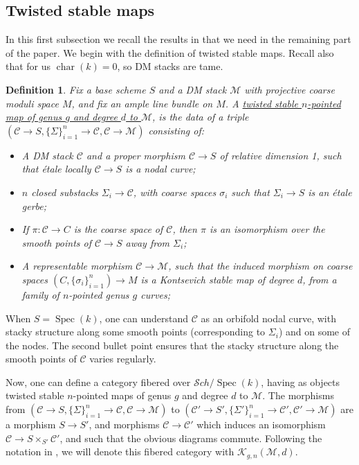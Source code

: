 \documentclass[11pt]{amsart}
\newcommand{\cC}{\mathcal{C}}
\newcommand{\sM}{\mathscr{M}}
\newcommand{\cS}{\mathcal{S}}
\newcommand{\spec}{\operatorname{Spec}}
\newtheorem{Def}[theorem]{Definition}
\theoremstyle{definition}
\begin{document}
\subsection{Twisted stable maps} In this first subsection we recall the results in \cite{AV2} that we need in the remaining part of the paper.
We begin with the definition of twisted stable maps. Recall also that for us $\operatorname{char}(k)=0$, so DM stacks are tame.
\begin{Def}
 Fix a base scheme $S$ and a DM stack $\sM$ with projective coarse moduli space $M$, and fix an ample line bundle on $M$.
 A \underline{twisted stable $n$-pointed map of genus $g$ and degree $d$ to $\sM$}, is the data of a triple $(\cC \to S ,\{\Sigma\}_{i=1}^n \to \cC, \cC \to \sM)$
 consisting of:
 \begin{itemize}
  \item A DM stack $\cC$ and a proper morphism $\cC \to S$ of relative dimension 1, such that étale locally $\cC \to S$ is a nodal curve;
   \item $n$ closed substacks $\Sigma_i \to \cC$, with coarse spaces $\sigma_i$ such that $\Sigma_i \to S$ is an étale gerbe;
  \item If $\pi:\cC \to C$ is the coarse space of $\cC$, then $\pi$ is an isomorphism over the smooth points of
  $\cC \to S$ away from $\Sigma_i$;
  \item A representable morphism $\cC \to \sM$, such that the induced morphism on coarse spaces $(C, \{\sigma_i\}_{i=1}^n) \to M$
  is a Kontsevich stable map of degree $d$, from a family of $n$-pointed genus $g$ curves;
  \end{itemize}
\end{Def}

When $S=\spec(k)$, one can understand $\cC$ as an orbifold nodal curve, with stacky structure along some smooth points (corresponding to $\Sigma_i$) and on some of the nodes.
The second bullet point ensures that the stacky structure along the smooth points of $\cC$ varies regularly.

Now, one can define a category fibered over $\cS ch/\spec(k)$, having as objects twisted stable $n$-pointed maps of genus $g$ and degree $d$ to $\sM$.
The morphisms from $(\cC \to S ,\{\Sigma\}_{i=1}^n \to \cC, \cC \to \sM)$ to
$(\cC' \to S' ,\{\Sigma'\}_{i=1}^n \to \cC', \cC' \to \sM)$ are a morphism $S \to S'$, and morphisms $\cC \to \cC'$ which induces an isomorphism
$\cC \to S \times_{S'} \cC'$, and such that the obvious
diagrams commute.
Following the notation in \cite{AV2}, we will denote this fibered category with $\mathcal{K}_{g,n}(\sM,d)$.
\end{document}
